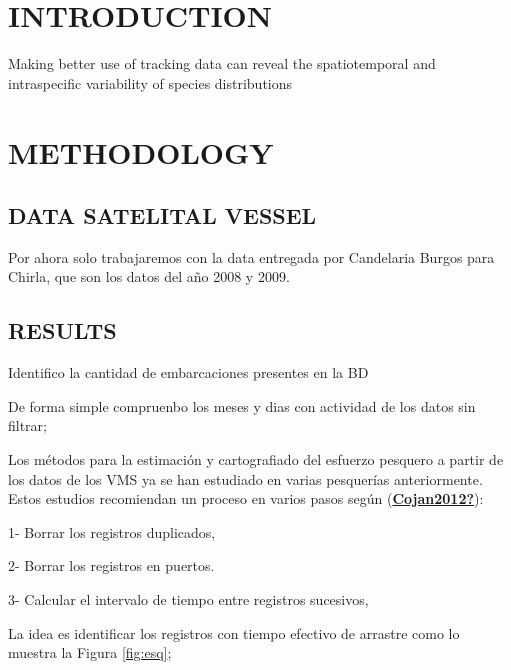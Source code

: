 \documentclass[
]{article}
\newenvironment{Shaded}{\begin{snugshade}}{\end{snugshade}}
\newcommand{\FunctionTok}[1]{\textcolor[rgb]{0.13,0.29,0.53}{\textbf{#1}}}
\newcommand{\NormalTok}[1]{#1}
\newcommand{\SpecialCharTok}[1]{\textcolor[rgb]{0.81,0.36,0.00}{\textbf{#1}}}
\begin{document}
\hypertarget{introduction}{%
\section{INTRODUCTION}\label{introduction}}

Making better use of tracking data can reveal the spatiotemporal and intraspecific variability of species distributions

\hypertarget{methodology}{%
\section{METHODOLOGY}\label{methodology}}

\hypertarget{data-satelital-vessel}{%
\subsection{DATA SATELITAL VESSEL}\label{data-satelital-vessel}}

Por ahora solo trabajaremos con la data entregada por Candelaria Burgos para Chirla, que son los datos del año 2008 y 2009.

\hypertarget{results}{%
\subsection{RESULTS}\label{results}}

Identifico la cantidad de embarcaciones presentes en la BD

\begin{Shaded}
\end{Shaded}

De forma simple compruenbo los meses y dias con actividad de los datos sin filtrar;

Los métodos para la estimación y cartografiado del esfuerzo pesquero a partir de los datos de los VMS ya se han estudiado en varias pesquerías anteriormente. Estos estudios recomiendan un proceso en varios pasos según (\protect\hyperlink{ref-Cojan2012}{\textbf{Cojan2012?}}):

1- Borrar los registros duplicados,

2- Borrar los registros en puertos.

3- Calcular el intervalo de tiempo entre registros sucesivos,

La idea es identificar los registros con tiempo efectivo de arrastre como lo muestra la Figura \ref{fig:esq};
\end{document}
